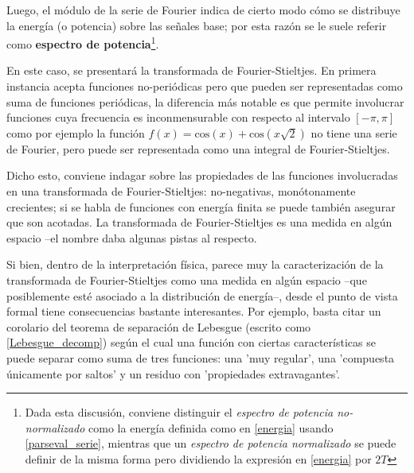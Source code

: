 \documentclass[12pt,a4paper]{mitthesis}
\newcommand{\COS}[1]{\mathrm{cos}\left( #1 \right)}
\begin{document}
Luego, el m\'odulo de la serie de Fourier indica de cierto 
modo c\'omo se distribuye la energ\'ia (o potencia) sobre las se\~nales base; por esta raz\'on se 
le suele referir como \textbf{espectro de potencia}\footnote{Dada esta discusi\'on, conviene 
distinguir el \textit{espectro de potencia no-normalizado} como la energ\'ia definida como en 
\ref{energia} usando \ref{parseval_serie}, mientras que un \textit{espectro de potencia 
normalizado} se puede definir de la misma forma pero dividiendo la expresi\'on en \ref{energia} por 
$2T$}.

En este caso, se presentar\'a la transformada de Fourier-Stieltjes. En primera instancia acepta 
funciones no-peri\'odicas pero que pueden ser representadas como suma de funciones peri\'odicas, la 
diferencia m\'as notable es que permite involucrar funciones cuya frecuencia es inconmensurable con 
respecto al intervalo $[-\pi,\pi]$ como por ejemplo la funci\'on $f(x) = \COS{x} + \COS{x\sqrt{2}}$
no tiene una serie de Fourier, pero puede ser representada como una integral de Fourier-Stieltjes.

Dicho esto, conviene indagar sobre las propiedades de las funciones involucradas en una 
transformada de Fourier-Stieltjes: no-negativas, monótonamente crecientes; si se habla de funciones
con energ\'ia finita se puede tambi\'en asegurar que son acotadas. La transformada de 
Fourier-Stieltjes es una medida en alg\'un espacio --el nombre daba algunas pistas al respecto. 

Si bien, dentro de la interpretaci\'on f\'isica, parece muy la caracterizaci\'on de la transformada 
de Fourier-Stieltjes como una medida en alg\'un espacio --que posiblemente est\'e asociado a la 
distribuci\'on de energ\'ia--, desde el punto de vista formal tiene consecuencias bastante 
interesantes.
Por ejemplo, basta citar un corolario del teorema de separaci\'on de Lebesgue (escrito como 
\ref{Lebesgue_decomp}) seg\'un el cual una funci\'on con ciertas caracter\'isticas se puede separar 
como suma de tres funciones: una 'muy regular', una 'compuesta \'unicamente por saltos' y 
un residuo con 'propiedades extravagantes'.
\end{document}
